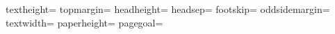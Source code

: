 \documentclass[11pt,a4paper]{article}
\begin{document}
\nopagebreak
textheight=\the\textheight
topmargin=\the\topmargin
headheight=\the\headheight
headsep=\the\headsep
footskip=\the\footskip
oddsidemargin=\the\oddsidemargin
textwidth=\the\textwidth
paperheight=\the\paperheight
pagegoal=\the\pagegoal
\newpage
\end{document}
